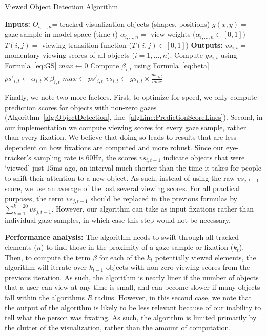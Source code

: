 \begin{algorithm}
\caption{Viewed Object Detection Algorithm}
\label{alg:ObjectDetection}
\begin{algorithmic}[1]
\State \textbf{Inputs: } 
\Statex $O_{i, \ldots, n}$= tracked visualization objects (shapes, positions)
\Statex $g(x,y) = $ gaze sample in model space (time $t$)
\Statex $\alpha_{i, \ldots, n} = $ view weights ($\alpha_{i, \ldots, n} \in [0,1]$)
\Statex $T(i,j) = $ viewing transition function ($T(i,j) \in [0,1]$)
\State \textbf{Outputs:}
\Statex $vs_{i,t} = $ momentary viewing scores of all objects ($i = 1, \ldots, n$). 
	\State Compute $gs_{i,t}$	using Formula~\ref{eq:GS}
\EndFor
\State $max \gets 0$
	 \label{algLine:PredictionScoreLines}
		\State Compute $\beta_{i,t}$	using Formula~\ref{eq:beta}
		\State $ps'_{i,t} \gets \alpha_{i,t} \times \beta_{i,t}$
			\State $max \gets ps'_{i,t}$
		\EndIf
	\EndIf
\EndFor
{}
	\State $vs_{i,t} \gets gs_{i,t} \times \frac{ps'_{i,t}}{max} $
\EndFor
\end{algorithmic}
\end{algorithm}

Finally, we note two more factors. First, to optimize for speed, we only compute prediction scores for objects with non-zero gazes (Algorithm~\ref{alg:ObjectDetection}, line~\ref{algLine:PredictionScoreLines}). Second, in our implementation we compute viewing scores for every gaze sample, rather than every fixation. We believe that doing so leads to results that are less dependent on how fixations are computed and more robust. Since our eye-tracker's sampling rate is $60$Hz, the scores $vs_{i, t-1}$ indicate objects that were `viewed' just $15$ms ago, an interval much shorter than the time it takes for people to shift their attention to a new object. As such, instead of using the raw $vs_{j,t-1}$ score, we use an average of the last several viewing scores. For all practical purposes, the term $vs_{j,t-1}$ should be replaced in the previous formulas by $ \sum_{k=1}^{k=20}{vs_{j,t-1}}$.  However, our algorithm can take as input fixations rather than individual gaze samples, in which case this step would not be necessary. 

{\bf Performance analysis:} The algorithm needs to swift through all tracked elements ($n$) to find those in the proximity of a gaze sample or fixation ($k_t$). Then, to compute the term $\beta$ for each of the $k_t$ potentially viewed elements, the algorithm will iterate over $k_{t-1}$ objects with non-zero viewing scores from the previous iteration. As such, the algorithm is nearly liner if the number of objects that a user can view at any time is small, and can become slower if many objects fall within the algorithms $R$ radius. However, in this second case, we note that the output of the algorithm is likely to be less relevant because of our inability to tell what the person was fixating. As such, the algorithm is limited primarily by the clutter of the visualization, rather than the amount of computation.  


